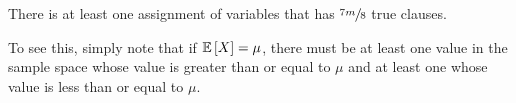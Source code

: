 \begin{theorem}{}{}
    There is at least one assignment of variables that has $\sfrac{7m}{8}$ true
    clauses.
\end{theorem}

To see this, simply note that if $\operatorname{\mathbb{E}}\left[X\right] = \mu$, there must be at least
one value in the sample space whose value is greater than or equal to $\mu$ and
at least one whose value is less than or equal to $\mu$.